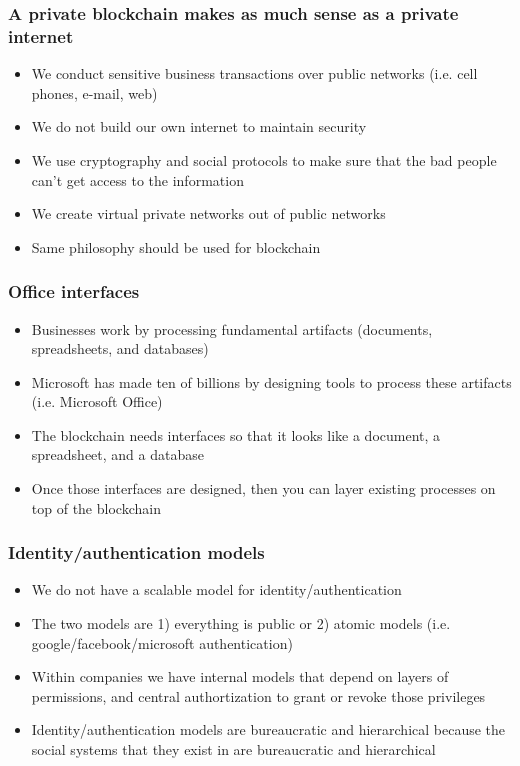 \documentclass{beamer}
\begin{document}
\begin{frame}
  \frametitle{A private blockchain makes as much sense as a private internet}
  \begin{itemize}
    \item We conduct sensitive business transactions over public
      networks (i.e. cell phones, e-mail, web)
    \item We do not build our own internet to maintain security
    \item We use cryptography and social protocols to make sure that
      the bad people can't get access to the information
    \item We create virtual private networks out of public networks
    \item Same philosophy should be used for blockchain
  \end{itemize}
\end{frame}
\begin{frame}
  \frametitle{Office interfaces}
  \begin{itemize}
    \item Businesses work by processing fundamental artifacts
      (documents, spreadsheets, and databases)
    \item Microsoft has made ten of billions by designing tools to
      process these artifacts (i.e. Microsoft Office)
    \item The blockchain needs interfaces so that it looks like a
      document, a spreadsheet, and a database
    \item Once those interfaces are designed, then you can layer
      existing processes on top of the blockchain
  \end{itemize}
\end{frame}
\begin{frame}
  \frametitle{Identity/authentication models}
  \begin{itemize}
  \item We do not have a scalable model for identity/authentication
  \item The two models are 1) everything is public or 2) atomic models
    (i.e. google/facebook/microsoft authentication)
  \item Within companies we have internal models that depend on layers
    of permissions, and central authortization to grant or revoke
    those privileges
  \item Identity/authentication models are bureaucratic and
    hierarchical because the social systems that they exist in are
    bureaucratic and hierarchical
  \end{itemize}
\end{frame}
\end{document}
